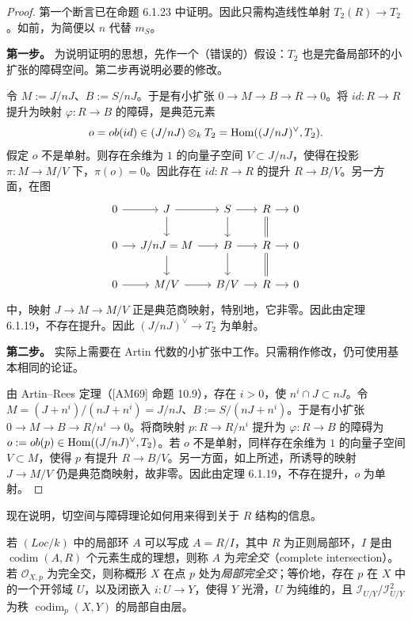 \begin{proof}
第一个断言已在命题 6.1.23 中证明。因此只需构造线性单射 $T_2(R)\to T_2$。如前，为简便以 $n$ 代替 $m_S$。

\textbf{第一步。} 为说明证明的思想，先作一个（错误的）假设：$T_2$ 也是完备局部环的小扩张的障碍空间。第二步再说明必要的修改。

令 $M:=J/nJ$、$B:=S/nJ$。于是有小扩张 $0\to M\to B\to R\to0$。将 $id:R\to R$ 提升为映射 $\varphi:R\to B$ 的障碍，是典范元素
\[
o=ob(id)\in(J/nJ)\otimes_k T_2=\operatorname{Hom}((J/nJ)^\vee,T_2).
\]
假定 $o$ 不是单射。则存在余维为 $1$ 的向量子空间 $V\subset J/nJ$，使得在投影 $\pi:M\to M/V$ 下，$\pi(o)=0$。因此存在 $id:R\to R$ 的提升 $R\to B/V$。另一方面，在图
\[
\begin{tikzcd}[column sep=small]
0\arrow[r]&J\arrow[r]\arrow[d]&S\arrow[r]\arrow[d]&R\arrow[r]\arrow[d,equal]&0\\
0\arrow[r]&J/nJ=M\arrow[r]\arrow[d]&B\arrow[r]\arrow[d]&R\arrow[r]\arrow[d,equal]&0\\
0\arrow[r]&M/V\arrow[r]&B/V\arrow[r]&R\arrow[r]&0
\end{tikzcd}
\]
中，映射 $J\to M\to M/V$ 正是典范商映射，特别地，它非零。因此由定理 6.1.19，不存在提升。因此 $(J/nJ)^\vee\to T_2$ 为单射。

\textbf{第二步。} 实际上需要在 Artin 代数的小扩张中工作。只需稍作修改，仍可使用基本相同的论证。

由 Artin--Rees 定理（[AM69] 命题 10.9），存在 $i>0$，使 $n^i\cap J\subset nJ$。令 $M=(J+n^i)/(nJ+n^i)=J/nJ$、$B:=S/(nJ+n^i)$。于是有小扩张 $0\to M\to B\to R/n^i\to0$。将商映射 $p:R\to R/n^i$ 提升为 $\varphi:R\to B$ 的障碍为 $o:=ob(p)\in\operatorname{Hom}((J/nJ)^\vee,T_2)$。若 $o$ 不是单射，同样存在余维为 $1$ 的向量子空间 $V\subset M$，使得 $p$ 有提升 $R\to B/V$。另一方面，如上所述，所诱导的映射 $J\to M/V$ 仍是典范商映射，故非零。因此由定理 6.1.19，不存在提升，$o$ 为单射。
\end{proof}
现在说明，切空间与障碍理论如何用来得到关于 $R$ 结构的信息。

若 $(Loc/k)$ 中的局部环 $A$ 可以写成 $A=R/I$，其中 $R$ 为正则局部环，$I$ 是由 $\operatorname{codim}(A,R)$ 个元素生成的理想，则称 $A$ 为\emph{完全交}（complete intersection）。若 $\mathcal O_{X,p}$ 为完全交，则称概形 $X$ 在点 $p$ 处为\emph{局部完全交}；等价地，存在 $p$ 在 $X$ 中的一个开邻域 $U$，以及闭嵌入 $i:U\to Y$，使得 $Y$ 光滑，$U$ 为纯维的，且 $\mathcal I_{U/Y}/\mathcal I_{U/Y}^2$ 为秩 $\operatorname{codim}_p(X,Y)$ 的局部自由层。

